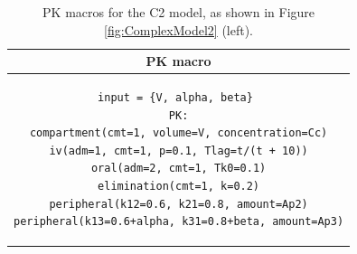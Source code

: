 \begin{table}[ht!]
\setlength{\tabcolsep}{1pt}
\begin{center}
\begin{tabular}{c}
  \hline \hline
PK macro  \\[-.25ex]
  \hline
\lstset{language=NONMEMdataSet}
\begin{lstlisting}
input = {V, alpha, beta} 
PK:
compartment(cmt=1, volume=V, concentration=Cc)
iv(adm=1, cmt=1, p=0.1, Tlag=t/(t + 10))
oral(adm=2, cmt=1, Tk0=0.1)
elimination(cmt=1, k=0.2)
peripheral(k12=0.6, k21=0.8, amount=Ap2)
peripheral(k13=0.6+alpha, k31=0.8+beta, amount=Ap3)
\end{lstlisting}
\\
  \hline
\end{tabular}
\caption{PK macros  for the C2 model, as shown in Figure \ref{fig:ComplexModel2} (left).}
\label{tab:C3Table}
\end{center}
\end{table}


